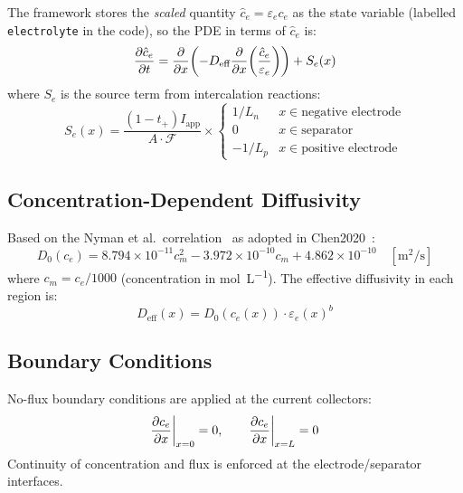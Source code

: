 The framework stores the \emph{scaled} quantity $\hat{c}_e = \varepsilon_e c_e$ as the state variable (labelled \texttt{electrolyte} in the code), so the PDE in terms of $\hat{c}_e$ is:
\begin{equation}
  \dfrac{\partial \hat{c}_e}{\partial t} = \dfrac{\partial }{\partial x}\!\left(-D_\text{eff} \dfrac{\partial }{\partial x}\!\left(\frac{\hat{c}_e}{\varepsilon_e}\right)\right) + S_e(x)
  \label{eq:electrolyte_state}
\end{equation}
where $S_e$ is the source term from intercalation reactions:
\begin{equation}
  S_e(x) = \frac{(1-t_+)I_\text{app}}{A \cdot \mathcal{F}} \times
  \begin{cases}
    1/L_n & x \in \text{negative electrode}\\
    0 & x \in \text{separator}\\
    -1/L_p & x \in \text{positive electrode}
  \end{cases}
  \label{eq:electrolyte_source}
\end{equation}

\subsection{Concentration-Dependent Diffusivity}

Based on the Nyman et al.\ correlation~\cite{Nyman2008} as adopted in Chen2020~\cite{Chen2020}:
\begin{equation}
  D_0(c_e) = 8.794\times10^{-11} c_m^2 - 3.972\times10^{-10} c_m + 4.862\times10^{-10} \quad [\si{\meter\squared\per\second}]
  \label{eq:D0_correlation}
\end{equation}
where $c_m = c_e/1000$ (concentration in \si{\mol\per\liter}). The effective diffusivity in each region is:
\begin{equation}
  D_\text{eff}(x) = D_0(c_e(x)) \cdot \varepsilon_e(x)^b
  \label{eq:Deff}
\end{equation}

\subsection{Boundary Conditions}

No-flux boundary conditions are applied at the current collectors:
\begin{equation}
  \dfrac{\partial c_e}{\partial x}\bigg|_{x=0} = 0, \qquad \dfrac{\partial c_e}{\partial x}\bigg|_{x=L} = 0
  \label{eq:electrolyte_bc}
\end{equation}
Continuity of concentration and flux is enforced at the electrode/separator interfaces.

